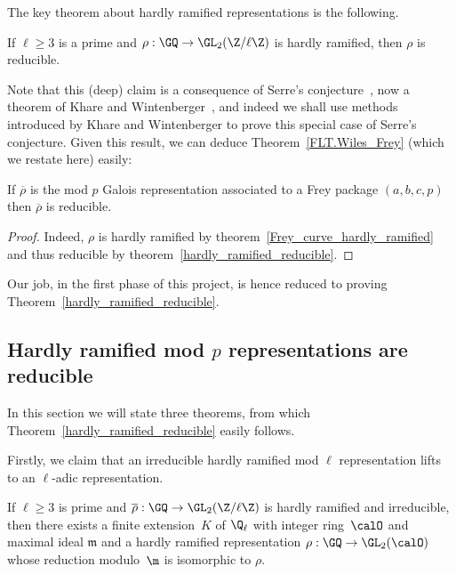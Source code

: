 The key theorem about hardly ramified representations is the following.

\begin{theorem}
  \label{hardly_ramified_reducible}
  If $\ell\geq 3$ is a prime and $\rho:\GQ\to\GL_2(\Z/\ell\Z)$ is hardly ramified,
  then $\rho$ is reducible.
\end{theorem}

Note that this (deep) claim is a consequence of Serre's conjecture~\cite{serreconj},
now a theorem of Khare and Wintenberger~\cite{kwII}, and indeed we shall use
methods introduced by Khare and Wintenberger to prove this special case of
Serre's conjecture. Given this result, we can deduce Theorem~\ref{FLT.Wiles_Frey}
(which we restate here) easily:

\begin{theorem}
  \label{FLT.Wiles_Frey'}
  \leanok
  If $\overline{\rho}$ is the mod $p$ Galois representation associated to a Frey package $(a,b,c,p)$ then
  $\overline{\rho}$ is reducible.
\end{theorem}
\begin{proof}
  Indeed, $\rho$ is hardly ramified by theorem~\ref{Frey_curve_hardly_ramified}
  and thus reducible by theorem~\ref{hardly_ramified_reducible}.
\end{proof}

Our job, in the first phase of this project, is hence reduced to proving
Theorem~\ref{hardly_ramified_reducible}.

\subsection{Hardly ramified mod $p$ representations are reducible}

In this section we will state three theorems, from which Theorem~\ref{hardly_ramified_reducible}
easily follows.

Firstly, we claim that
an irreducible hardly ramified mod $\ell$ representation lifts to an $\ell$-adic representation.

\begin{theorem}
  \label{hardly-ramified-lifts}
  If $\ell\geq3$ is prime and $\overline{\rho}:\GQ\to\GL_2(\Z/\ell\Z)$
  is hardly ramified and irreducible, then there exists a finite extension~$K$ of $\Q_\ell$
  with integer ring~$\calO$ and maximal ideal $\mathfrak{m}$
  and a hardly ramified representation
  $\rho:\GQ\to\GL_2(\calO)$ whose reduction modulo~$\m$ is isomorphic to $\rho$.
\end{theorem}

